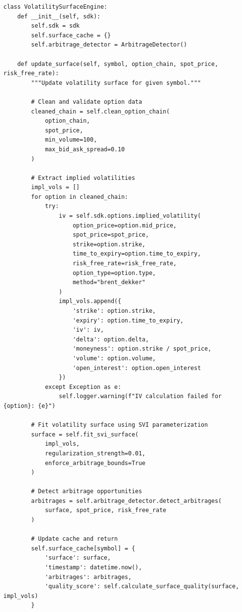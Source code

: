 \documentclass[12pt,a4paper]{article}
\theoremstyle{definition}
\theoremstyle{remark}
\begin{document}
\begin{lstlisting}[caption=Real-Time Volatility Surface Engine]
class VolatilitySurfaceEngine:
    def __init__(self, sdk):
        self.sdk = sdk
        self.surface_cache = {}
        self.arbitrage_detector = ArbitrageDetector()
        
    def update_surface(self, symbol, option_chain, spot_price, risk_free_rate):
        """Update volatility surface for given symbol."""
        
        # Clean and validate option data
        cleaned_chain = self.clean_option_chain(
            option_chain, 
            spot_price, 
            min_volume=100,
            max_bid_ask_spread=0.10
        )
        
        # Extract implied volatilities
        impl_vols = []
        for option in cleaned_chain:
            try:
                iv = self.sdk.options.implied_volatility(
                    option_price=option.mid_price,
                    spot_price=spot_price,
                    strike=option.strike,
                    time_to_expiry=option.time_to_expiry,
                    risk_free_rate=risk_free_rate,
                    option_type=option.type,
                    method="brent_dekker"
                )
                impl_vols.append({
                    'strike': option.strike,
                    'expiry': option.time_to_expiry,
                    'iv': iv,
                    'delta': option.delta,
                    'moneyness': option.strike / spot_price,
                    'volume': option.volume,
                    'open_interest': option.open_interest
                })
            except Exception as e:
                self.logger.warning(f"IV calculation failed for {option}: {e}")
        
        # Fit volatility surface using SVI parameterization
        surface = self.fit_svi_surface(
            impl_vols, 
            regularization_strength=0.01,
            enforce_arbitrage_bounds=True
        )
        
        # Detect arbitrage opportunities
        arbitrages = self.arbitrage_detector.detect_arbitrages(
            surface, spot_price, risk_free_rate
        )
        
        # Update cache and return
        self.surface_cache[symbol] = {
            'surface': surface,
            'timestamp': datetime.now(),
            'arbitrages': arbitrages,
            'quality_score': self.calculate_surface_quality(surface, impl_vols)
        }
        

\end{lstlisting}
\end{document}
